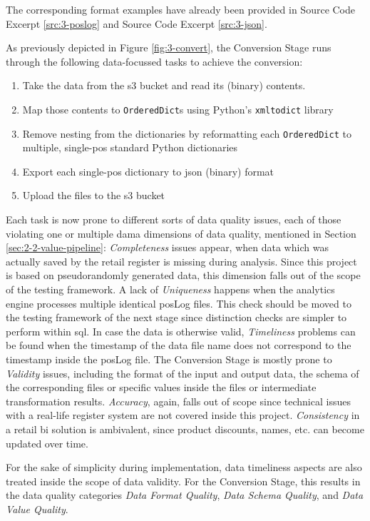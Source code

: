 The corresponding format examples have already been provided in Source Code Excerpt \ref{src:3-poslog} and Source Code Excerpt \ref{src:3-json}.

As previously depicted in Figure \ref{fig:3-convert}, the Conversion Stage runs through the following data-focussed tasks to achieve the conversion:

\begin{enumerate}
	\item Take the data from the \ac{s3} bucket and read its (binary) contents.
	\item Map those contents to \texttt{OrderedDict}s using Python's \texttt{xmltodict} library
	\item Remove nesting from the dictionaries by reformatting each \texttt{OrderedDict} to multiple, single-\ac{pos} standard Python dictionaries
	\item Export each single-\ac{pos} dictionary to \ac{json} (binary) format
	\item Upload the files to the \ac{s3} bucket
\end{enumerate}

Each task is now prone to different sorts of data quality issues, each of those violating one or multiple \ac{dama} dimensions of data quality, mentioned in Section \ref{sec:2-2-value-pipeline}: \textit{Completeness} issues appear, when data which was actually saved by the retail register is missing during analysis. Since this project is based on pseudorandomly generated data, this dimension falls out of the scope of the testing framework. A lack of \textit{Uniqueness} happens when the analytics engine processes multiple identical \ac{pos}Log files. This check should be moved to the testing framework of the next stage since distinction checks are simpler to perform within \ac{sql}. In case the data is otherwise valid, \textit{Timeliness} problems can be found when the timestamp of the data file name does not correspond to the timestamp inside the \ac{pos}Log file. The Conversion Stage is mostly prone to \textit{Validity} issues, including the format of the input and output data, the schema of the corresponding files or specific values inside the files or intermediate transformation results. \textit{Accuracy}, again, falls out of scope since technical issues with a real-life register system are not covered inside this project.  \textit{Consistency} in a retail \ac{bi} solution is ambivalent, since product discounts, names, etc. can become updated over time.

For the sake of simplicity during implementation, data timeliness aspects are also treated inside the scope of data validity. For the Conversion Stage, this results in the data quality categories \textit{Data Format Quality}, \textit{Data Schema Quality}, and \textit{Data Value Quality}.

